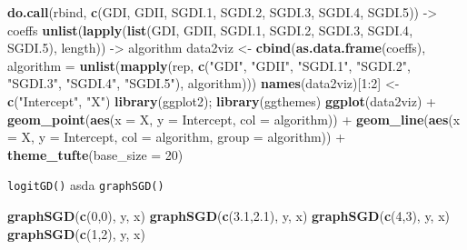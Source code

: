 \documentclass[]{article}
\newenvironment{Shaded}{\begin{snugshade}}{\end{snugshade}}
\newcommand{\KeywordTok}[1]{\textcolor[rgb]{0.13,0.29,0.53}{\textbf{{#1}}}}
\newcommand{\DataTypeTok}[1]{\textcolor[rgb]{0.13,0.29,0.53}{{#1}}}
\newcommand{\DecValTok}[1]{\textcolor[rgb]{0.00,0.00,0.81}{{#1}}}
\newcommand{\FloatTok}[1]{\textcolor[rgb]{0.00,0.00,0.81}{{#1}}}
\newcommand{\StringTok}[1]{\textcolor[rgb]{0.31,0.60,0.02}{{#1}}}
\newcommand{\NormalTok}[1]{{#1}}
\begin{document}
\begin{Shaded}
\begin{Highlighting}[]
\KeywordTok{do.call}\NormalTok{(rbind, }\KeywordTok{c}\NormalTok{(GDI, GDII, SGDI}\FloatTok{.1}\NormalTok{, SGDI}\FloatTok{.2}\NormalTok{, SGDI}\FloatTok{.3}\NormalTok{, SGDI}\FloatTok{.4}\NormalTok{, SGDI}\FloatTok{.5}\NormalTok{)) ->}\StringTok{ }\NormalTok{coeffs}
\KeywordTok{unlist}\NormalTok{(}\KeywordTok{lapply}\NormalTok{(}\KeywordTok{list}\NormalTok{(GDI, GDII, SGDI}\FloatTok{.1}\NormalTok{, SGDI}\FloatTok{.2}\NormalTok{, SGDI}\FloatTok{.3}\NormalTok{, SGDI}\FloatTok{.4}\NormalTok{, SGDI}\FloatTok{.5}\NormalTok{), length)) ->}\StringTok{ }\NormalTok{algorithm}
\NormalTok{data2viz <-}\StringTok{ }\KeywordTok{cbind}\NormalTok{(}\KeywordTok{as.data.frame}\NormalTok{(coeffs),}
      \DataTypeTok{algorithm =} \KeywordTok{unlist}\NormalTok{(}\KeywordTok{mapply}\NormalTok{(rep, }\KeywordTok{c}\NormalTok{(}\StringTok{"GDI"}\NormalTok{, }\StringTok{"GDII"}\NormalTok{, }\StringTok{"SGDI.1"}\NormalTok{, }\StringTok{"SGDI.2"}\NormalTok{, }\StringTok{"SGDI.3"}\NormalTok{, }\StringTok{"SGDI.4"}\NormalTok{, }\StringTok{"SGDI.5"}\NormalTok{), algorithm)))}
\KeywordTok{names}\NormalTok{(data2viz)[}\DecValTok{1}\NormalTok{:}\DecValTok{2}\NormalTok{] <-}\StringTok{ }\KeywordTok{c}\NormalTok{(}\StringTok{"Intercept"}\NormalTok{, }\StringTok{"X"}\NormalTok{)}
\KeywordTok{library}\NormalTok{(ggplot2); }\KeywordTok{library}\NormalTok{(ggthemes)}
\KeywordTok{ggplot}\NormalTok{(data2viz) +}
\StringTok{  }\KeywordTok{geom_point}\NormalTok{(}\KeywordTok{aes}\NormalTok{(}\DataTypeTok{x =} \NormalTok{X, }\DataTypeTok{y =} \NormalTok{Intercept, }\DataTypeTok{col =} \NormalTok{algorithm)) +}
\StringTok{  }\KeywordTok{geom_line}\NormalTok{(}\KeywordTok{aes}\NormalTok{(}\DataTypeTok{x =} \NormalTok{X, }\DataTypeTok{y =} \NormalTok{Intercept, }\DataTypeTok{col =} \NormalTok{algorithm,}
                \DataTypeTok{group =} \NormalTok{algorithm)) +}
\StringTok{  }\KeywordTok{theme_tufte}\NormalTok{(}\DataTypeTok{base_size =} \DecValTok{20}\NormalTok{)}
\end{Highlighting}
\end{Shaded}

\texttt{logitGD()} asda \texttt{graphSGD()}

\begin{Shaded}
\begin{Highlighting}[]
\KeywordTok{graphSGD}\NormalTok{(}\KeywordTok{c}\NormalTok{(}\DecValTok{0}\NormalTok{,}\DecValTok{0}\NormalTok{), y, x)}
\KeywordTok{graphSGD}\NormalTok{(}\KeywordTok{c}\NormalTok{(}\FloatTok{3.1}\NormalTok{,}\FloatTok{2.1}\NormalTok{), y, x)}
\KeywordTok{graphSGD}\NormalTok{(}\KeywordTok{c}\NormalTok{(}\DecValTok{4}\NormalTok{,}\DecValTok{3}\NormalTok{), y, x)}
\KeywordTok{graphSGD}\NormalTok{(}\KeywordTok{c}\NormalTok{(}\DecValTok{1}\NormalTok{,}\DecValTok{2}\NormalTok{), y, x)}
\end{Highlighting}
\end{Shaded}
\end{document}
